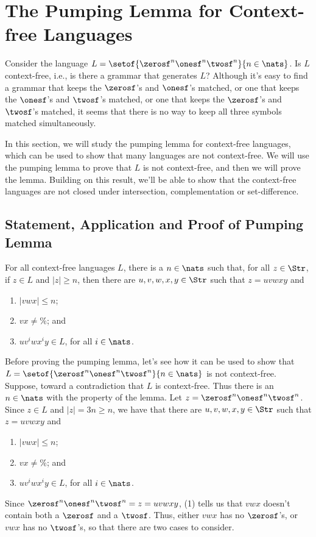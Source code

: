 \section{The Pumping Lemma for Context-free Languages}
\label{ThePumpingLemmaForContextFreeLanguages}

Consider the language $L =
\setof{\zerosf^n\onesf^n\twosf^n}{n\in\nats}$.  Is $L$ context-free,
i.e., is there a grammar that generates $L$?  Although it's easy to
find a grammar that keeps the $\zerosf$'s and $\onesf$'s matched, or
one that keeps the $\onesf$'s and $\twosf$'s matched, or one that
keeps the $\zerosf$'s and $\twosf$'s matched, it seems that there is
no way to keep all three symbols matched simultaneously.

In this section, we will study the pumping lemma for context-free
languages, which can be used to show that many languages are not
context-free.  We will use the pumping lemma to prove that $L$ is not
context-free, and then we will prove the lemma.  Building on this
result, we'll be able to show that the context-free languages are not
closed under intersection, complementation or set-difference.

\subsection{Statement, Application and Proof of Pumping Lemma}

\begin{lemma}
For all context-free languages $L$, there is a
$n\in\nats$ such that, for all $z\in\Str$, if $z\in L$
and $|z|\geq n$, then there are $u,v,w,x,y\in\Str$ such
that $z=uvwxy$ and
\begin{enumerate}[\quad(1)]
\item $|vwx|\leq n$;

\item $vx\neq\%$; and

\item $uv^iwx^iy\in L$, for all $i\in\nats$.
\end{enumerate}
\end{lemma}

Before proving the pumping lemma, let's see how it can be used to show
that $L=\setof{\zerosf^n\onesf^n\twosf^n}{n\in\nats}$ is not
context-free.  Suppose, toward a contradiction that $L$ is
context-free.  Thus there is an $n\in\nats$ with the property of the
lemma.  Let $z={\zerosf^n\onesf^n\twosf^n}$.
Since $z\in L$ and $|z|=3n\geq n$, we have that there are
$u,v,w,x,y\in\Str$ such that $z=uvwxy$ and
\begin{enumerate}[\quad(1)]
\item $|vwx|\leq n$;

\item $vx\neq\%$; and

\item $uv^iwx^iy\in L$, for all $i\in\nats$.
\end{enumerate}
Since $\zerosf^n\onesf^n\twosf^n=z=uvwxy$, (1) tells us that
$vwx$ doesn't contain both a $\zerosf$ and a $\twosf$.
Thus, either $vwx$ has no $\zerosf$'s, or $vwx$ has no $\twosf$'s, so that
there are two cases to consider.

